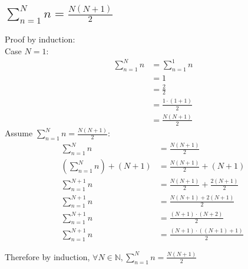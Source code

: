 \documentclass[11pt, oneside]{article}   	%
\begin{document}
\subsection{$\sum\limits_{n=1}^{N}n= \frac{N(N+1)}{2}$}
	Proof by induction:\\
	Case $N=1$:
	\begin{align*}
		\sum\limits_{n=1}^{N}n &= \sum\limits_{n=1}^{1}n \\
		&= 1\\
		&= \frac 2 2\\
		&= \frac{1\cdot(1 + 1)}{2}\\
		&= \frac{N(N+1)}{2}
	\end{align*}
	Assume $\sum\limits_{n=1}^{N}n= \frac{N(N+1)}{2}$:
	\begin{align*}
		\sum_{n=1}^N n &= \frac{N(N+1)} 2\\
		\left(\sum_{n = 1}^N n\right) + (N + 1) &= \frac {N(N+1)} 2 + (N+1)\\
		\sum_{n = 1}^{N+1} n &= \frac {N ( N+1)} 2 + \frac{2(N + 1)} 2\\
		\sum_{n = 1}^{N+1} n &= \frac {N ( N+1) + 2(N + 1)} 2\\
		\sum_{n = 1}^{N+1} n &= \frac {(N+1)\cdot (N + 2)} 2\\
		\sum_{n = 1}^{N+1} n &= \frac{(N+1)\cdot ((N+1) + 1)} 2
	\end{align*}

	Therefore by induction, $\forall N \in \mathbb{N}, \sum\limits_{n=1}^{N}n= \frac{N(N+1)}{2}$
\end{document}

